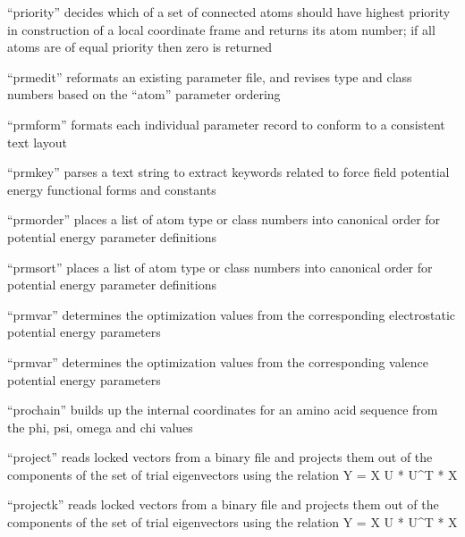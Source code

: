 \documentclass[letterpaper,11pt,english]{sphinxmanual}
\begin{document}
“priority” decides which of a set of connected atoms should
have highest priority in construction of a local coordinate
frame and returns its atom number; if all atoms are of equal
priority then zero is returned


“prmedit” reformats an existing parameter file, and revises
type and class numbers based on the “atom” parameter ordering


“prmform” formats each individual parameter record to conform
to a consistent text layout


“prmkey” parses a text string to extract keywords related to
force field potential energy functional forms and constants


“prmorder” places a list of atom type or class numbers into
canonical order for potential energy parameter definitions


“prmsort” places a list of atom type or class numbers into
canonical order for potential energy parameter definitions


“prmvar” determines the optimization values from the
corresponding electrostatic potential energy parameters


“prmvar” determines the optimization values from the
corresponding valence potential energy parameters


“prochain” builds up the internal coordinates for an amino
acid sequence from the phi, psi, omega and chi values



“project” reads locked vectors from a binary file and projects
them out of the components of the set of trial eigenvectors
using the relation Y = X \sphinxhyphen{} U * U\textasciicircum{}T * X


“projectk” reads locked vectors from a binary file and projects
them out of the components of the set of trial eigenvectors
using the relation Y = X \sphinxhyphen{} U * U\textasciicircum{}T * X
\end{document}
